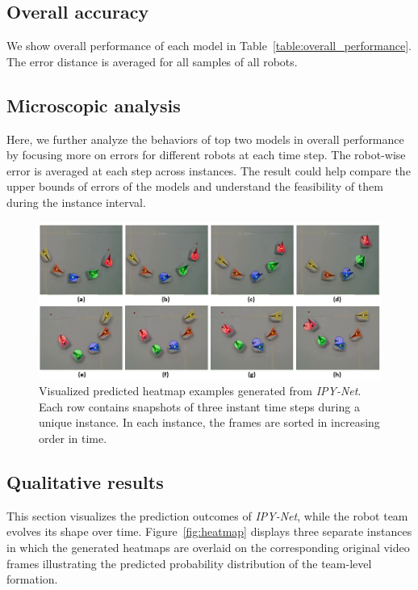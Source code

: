 \documentclass[letterpaper, 10 pt, conference]{ieeeconf}  %
\begin{document}
	
	\subsection{Overall accuracy}
	\label{sec:overall_performance}
	
	We show overall performance of each model in Table~\ref{table:overall_performance}. 
	The error distance is averaged for all samples of all robots. 

	
	\subsection{Microscopic analysis}
	\label{sec:microscopic_analysis}
	
	Here, we further analyze the behaviors of top two models in overall performance 
	by focusing more on errors for different robots at each time step. 
	The robot-wise error is averaged at each step across instances. 
	The result could help compare the upper bounds of errors of the models and 
	understand the feasibility of them during the instance interval. 

	
	\begin{figure}[t]
		\centering
		\includegraphics[width=1.8\columnwidth]{fig_preds}
		\caption{Visualized predicted heatmap examples generated from \emph{IPY-Net}. 
			Each row contains snapshots of three instant time steps during a unique 
			instance. In each instance, the frames are sorted in increasing order in time. 			 
		}
		\label{fig:preds}
	\end{figure}

	
	\subsection{Qualitative results} 
	\label{sec:qualitative_results} 

	This section visualizes the prediction outcomes of \emph{IPY-Net}, while the robot team
	evolves its shape over time. Figure~\ref{fig:heatmap} displays three separate instances in which 
	the generated heatmaps are overlaid on the corresponding original video frames illustrating 
	the predicted probability distribution of the team-level formation. 
	
\end{document}

